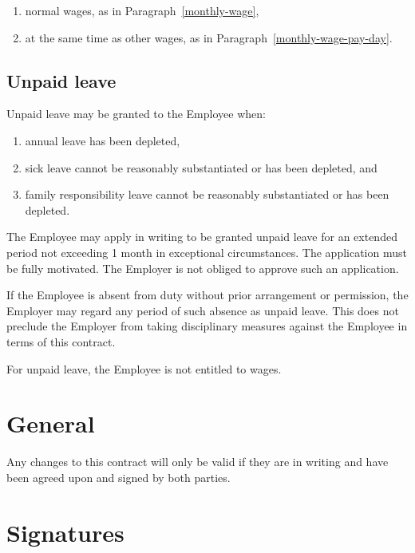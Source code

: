 \documentclass[a4paper,11pt]{article}
\begin{document}
\begin{enumerate}
  \item normal wages, as in Paragraph~\ref{monthly-wage},
  \item at the same time as other wages, as in
    Paragraph~\ref{monthly-wage-pay-day}.
\end{enumerate}

\subsection{Unpaid leave}
\label{unpaid-leave}

\para Unpaid leave may be granted to the Employee when:

\begin{enumerate}
  \item annual leave has been depleted,
  \item sick leave cannot be reasonably substantiated or has been depleted, and
  \item family responsibility leave cannot be reasonably substantiated or has
    been depleted.
\end{enumerate}

\para The Employee may apply in writing to be granted unpaid leave for an
extended period not exceeding 1 month in exceptional circumstances. The
application must be fully motivated. The Employer is not obliged to approve
such an application.

\para If the Employee is absent from duty without prior arrangement or
permission, the Employer may regard any period of such absence as unpaid leave.
This does not preclude the Employer from taking disciplinary measures against
the Employee in terms of this contract.

\para For unpaid leave, the Employee is not entitled to wages.

\section{General}
\label{general}

\para Any changes to this contract will only be valid if they are in writing
and have been agreed upon and signed by both parties.

\pagebreak

\section{Signatures}
\label{signatures}
\end{document}
